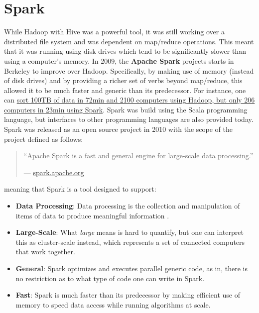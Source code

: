 \documentclass[]{book}
\providecommand{\tightlist}{%
  \setlength{\itemsep}{0pt}\setlength{\parskip}{0pt}}
\theoremstyle{definition}
\theoremstyle{definition}
\theoremstyle{definition}
\theoremstyle{remark}
\begin{document}
\hypertarget{spark}{%
\section{Spark}\label{spark}}

While Hadoop with Hive was a powerful tool, it was still working over a
distributed file system and was dependent on map/reduce operations. This
meant that it was running using disk drives which tend to be
significantly slower than using a computer's memory. In 2009, the
\textbf{Apache Spark} projects starts in Berkeley to improve over
Hadoop. Specifically, by making use of memory (instead of disk drives)
and by providing a richer set of verbs beyond map/reduce, this allowed
it to be much faster and generic than its predecessor. For instance, one
can
\href{https://databricks.com/blog/2014/11/05/spark-officially-sets-a-new-record-in-large-scale-sorting.html}{sort
100TB of data in 72min and 2100 computers using Hadoop, but only 206
computers in 23min using Spark}. Spark was build using the Scala
programming language, but interfaces to other programming languages are
also provided today. Spark was released as an open source project in
2010 with the scope of the project defined as follows:

\begin{quote}
``Apache Spark is a fast and general engine for large-scale data
processing.''

--- \href{http://spark.apache.org/}{spark.apache.org}
\end{quote}

meaning that Spark is a tool designed to support:

\begin{itemize}
\tightlist
\item
  \textbf{Data Processing}: Data processing is the collection and
  manipulation of items of data to produce meaningful information
  \citep{data-processing}.
\item
  \textbf{Large-Scale}: What \emph{large} means is hard to quantify, but
  one can interpret this as cluster-scale instead, which represents a
  set of connected computers that work together.
\item
  \textbf{General}: Spark optimizes and executes parallel generic code,
  as in, there is no restriction as to what type of code one can write
  in Spark.
\item
  \textbf{Fast}: Spark is much faster than its predecessor by making
  efficient use of memory to speed data access while running algorithms
  at scale.
\end{itemize}
\end{document}
